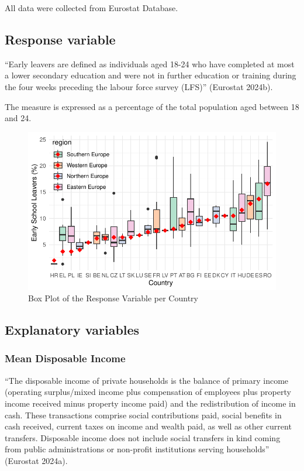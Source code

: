 \documentclass[
  letterpaper,
  DIV=11,
  numbers=noendperiod,
  abstract]{scrartcl}
\begin{document}
All data were collected from Eurostat Database.

\subsection{Response variable}\label{response-variable}

``Early leavers are defined as individuals aged 18-24 who have completed
at most a lower secondary education and were not in further education or
training during the four weeks preceding the labour force survey (LFS)''
(Eurostat 2024b).

The measure is expressed as a percentage of the total population aged
between 18 and 24.

\begin{figure}[H]

{\centering \includegraphics[width=1\textwidth,height=\textheight]{report_files/figure-pdf/boxplot esl-1.pdf}

}

\caption{Box Plot of the Response Variable per Country}

\end{figure}%

\subsection{Explanatory variables}\label{explanatory-variables}

\subsubsection{Mean Disposable Income}\label{mean-disposable-income}

``The disposable income of private households is the balance of primary
income (operating surplus/mixed income plus compensation of employees
plus property income received minus property income paid) and the
redistribution of income in cash. These transactions comprise social
contributions paid, social benefits in cash received, current taxes on
income and wealth paid, as well as other current transfers. Disposable
income does not include social transfers in kind coming from public
administrations or non-profit institutions serving households''
(Eurostat 2024a).
\end{document}
